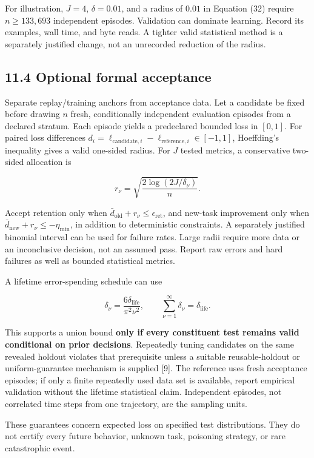 \documentclass[
  11pt,
  a4paper,
]{article}
\begin{document}
For illustration, \(J=4\), \(\delta=0.01\), and a radius of \(0.01\) in
Equation (32) require \(n\ge133{,}693\) independent episodes. Validation
can dominate learning. Record its examples, wall time, and byte reads. A
tighter valid statistical method is a separately justified change, not
an unrecorded reduction of the radius.

\subsection{11.4 Optional formal
acceptance}\label{optional-formal-acceptance}

Separate replay/training anchors from acceptance data. Let a candidate
be fixed before drawing \(n\) fresh, conditionally independent
evaluation episodes from a declared stratum. Each episode yields a
predeclared bounded loss in \([0,1]\). For paired loss differences
\(d_i=\ell_{\mathrm{candidate},i}-\ell_{\mathrm{reference},i}\in[-1,1]\),
Hoeffding's inequality gives a valid one-sided radius. For \(J\) tested
metrics, a conservative two-sided allocation is

\[
r_\nu=\sqrt{\frac{2\log(2J/\delta_\nu)}{n}}.
\tag{32}
\]

Accept retention only when
\(\bar d_{\mathrm{old}}+r_\nu\le\epsilon_{\mathrm{ret}}\), and new-task
improvement only when \(\bar d_{\mathrm{new}}+r_\nu\le-\eta_{\min}\), in
addition to deterministic constraints. A separately justified binomial
interval can be used for failure rates. Large radii require more data or
an inconclusive decision, not an assumed pass. Report raw errors and
hard failures as well as bounded statistical metrics.

A lifetime error-spending schedule can use

\[
\delta_\nu=\frac{6\delta_{\mathrm{life}}}{\pi^2\nu^2},
\qquad\sum_{\nu=1}^\infty\delta_\nu=\delta_{\mathrm{life}}.
\tag{33}
\]

This supports a union bound \textbf{only if every constituent test
remains valid conditional on prior decisions}. Repeatedly tuning
candidates on the same revealed holdout violates that prerequisite
unless a suitable reusable-holdout or uniform-guarantee mechanism is
supplied {[}9{]}. The reference uses fresh acceptance episodes; if only
a finite repeatedly used data set is available, report empirical
validation without the lifetime statistical claim. Independent episodes,
not correlated time steps from one trajectory, are the sampling units.

These guarantees concern expected loss on specified test distributions.
They do not certify every future behavior, unknown task, poisoning
strategy, or rare catastrophic event.
\end{document}
